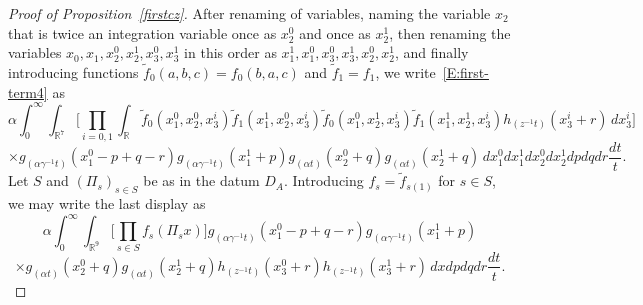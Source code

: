 \documentclass[12pt,reqno]{amsart}
\theoremstyle{plain}
\theoremstyle{definition}
\numberwithin{equation}{section}
\newcommand{\R}{{\mathbb R}}
\begin{document}
\begin{proof}[Proof of Proposition~\ref{firstcz}]
After renaming of variables, naming the variable $x_2$ that is twice an integration variable once as $x_2^0$ and once as $x_2^1$, then 
renaming the variables $x_0,x_1,x_2^0,x_2^1,x_3^0,x_3^1$ in this order as
$x_1^1,x_1^0,x_3^0,x_3^1,x_2^0,x_2^1$, and finally 
introducing functions $\widetilde{f}_0(a,b,c)=f_0(b,a,c)$ and $\widetilde{f}_1=f_1$, we write~\eqref{E:first-term4} as
\begin{equation*}
\alpha \int_{0}^\infty \int_{\R^7} 
\Big[ \prod_{i=0,1}\int_{\R}  \widetilde{f}_0(x_1^0, x_2^{0},x_3^i) \widetilde{f}_1(x_1^1,x_2^0,x_3^i) \widetilde{f}_0(x_1^0,x_2^1,x_3^i) \widetilde{f}_1(x_1^1,x_2^1,x_3^i)  h_{(z^{-1}t)}(x_3^i+r) \,dx_3^i \Big ]   \end{equation*}
\begin{equation*}
\times g_{(\alpha \gamma^{-1}t)}(x_1^0-p+q-r) g_{(\alpha \gamma^{-1}t)}(x_1^1+p) 
g_{(\alpha t)}(x_2^0+q)
g_{(\alpha t)}(x_2^1+q)\,
dx_1^0 dx_1^1 dx_2^0 dx_2^1 dp dq dr \frac{dt}{t}.
\end{equation*}
Let $S$ and $(\Pi_s)_{s\in S}$ be as in the datum $D_A$.
Introducing 
$f_{s}=\widetilde{f}_{s(1)}$ for $s \in S$,  we may write the last display as
\begin{equation*}
\alpha \int_{0}^\infty \int_{\R^9} \Big[ \prod_{s\in S} f_{s}(\Pi_{s} x) \Big] 
g_{(\alpha \gamma^{-1}t)}(x_1^0-p+q-r) g_{(\alpha \gamma^{-1}t)}(x_1^1+p)  
\end{equation*}
\begin{equation*}
\times g_{(\alpha t)}(x_2^0+q)
g_{(\alpha t)}(x_2^1+q) h_{(z^{-1}t)}(x_3^0+r) h_{(z^{-1}t)}(x_3^1+r)\,
dx dp dq dr \frac{dt}{t}.
\end{equation*}


\end{proof}
\end{document}
